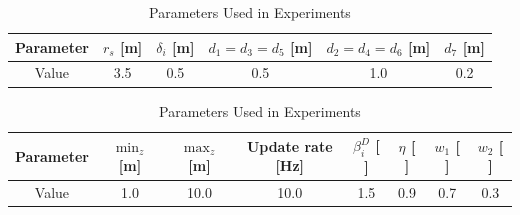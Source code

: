 


        \begin{table}[H]
            \centering
            \caption{Parameters Used in Experiments}
            \begin{tabular}{|c|c|c|c|c|c|}
                \hline
                Parameter & $r_s$ [m] & $\delta_i$ [m] & $d_1 = d_3 = d_5$ [m] & $d_2 = d_4 = d_6$ [m] & $d_7$ [m] \\ \hline
                Value     & 3.5       & 0.5            & 0.5                   & 1.0                   & 0.2       \\ \hline
            \end{tabular}
        
            \vspace{0.3cm}
        
            \begin{tabular}{|c|c|c|c|c|c|c|c|}
                \hline
                Parameter & $\min_z$ [m] & $\max_z$ [m] & Update rate [Hz] & $\beta_i^D$ [ ] & $\eta$ [ ] & $w_1$ [ ] & $w_2$ [ ] \\ \hline
                Value     & 1.0          & 10.0         & 10.0             & 1.5             & 0.9        & 0.7       & 0.3       \\ \hline
            \end{tabular}
            \label{tab:experiment_parameters_combined}
        \end{table}


